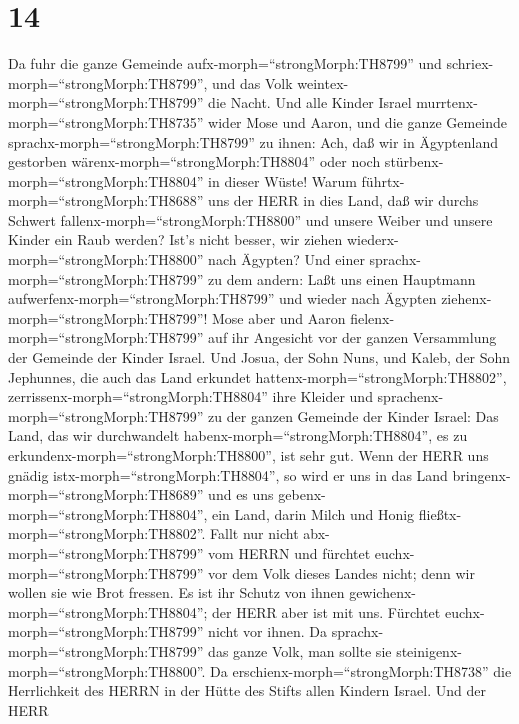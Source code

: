 \hypertarget{section-13}{%
\section{14}\label{section-13}}

 Da fuhr die ganze Gemeinde
aufx-morph=``strongMorph:TH8799'' und
schriex-morph=``strongMorph:TH8799'', und das Volk
weintex-morph=``strongMorph:TH8799'' die Nacht.  Und alle
Kinder Israel murrtenx-morph=``strongMorph:TH8735'' wider Mose und
Aaron, und die ganze Gemeinde sprachx-morph=``strongMorph:TH8799'' zu
ihnen: Ach, daß wir in Ägyptenland gestorben
wärenx-morph=``strongMorph:TH8804'' oder noch
stürbenx-morph=``strongMorph:TH8804'' in dieser Wüste! 
Warum führtx-morph=``strongMorph:TH8688'' uns der HERR in dies Land, daß
wir durchs Schwert fallenx-morph=``strongMorph:TH8800'' und unsere
Weiber und unsere Kinder ein Raub werden? Ist's nicht besser, wir ziehen
wiederx-morph=``strongMorph:TH8800'' nach Ägypten?  Und
einer sprachx-morph=``strongMorph:TH8799'' zu dem andern: Laßt uns einen
Hauptmann aufwerfenx-morph=``strongMorph:TH8799'' und wieder nach
Ägypten ziehenx-morph=``strongMorph:TH8799''!  Mose aber und
Aaron fielenx-morph=``strongMorph:TH8799'' auf ihr Angesicht vor der
ganzen Versammlung der Gemeinde der Kinder Israel.  Und
Josua, der Sohn Nuns, und Kaleb, der Sohn Jephunnes, die auch das Land
erkundet hattenx-morph=``strongMorph:TH8802'',
zerrissenx-morph=``strongMorph:TH8804'' ihre Kleider  und
sprachenx-morph=``strongMorph:TH8799'' zu der ganzen Gemeinde der Kinder
Israel: Das Land, das wir durchwandelt
habenx-morph=``strongMorph:TH8804'', es zu
erkundenx-morph=``strongMorph:TH8800'', ist sehr gut.  Wenn
der HERR uns gnädig istx-morph=``strongMorph:TH8804'', so wird er uns in
das Land bringenx-morph=``strongMorph:TH8689'' und es uns
gebenx-morph=``strongMorph:TH8804'', ein Land, darin Milch und Honig
fließtx-morph=``strongMorph:TH8802''.  Fallt nur nicht
abx-morph=``strongMorph:TH8799'' vom HERRN und fürchtet
euchx-morph=``strongMorph:TH8799'' vor dem Volk dieses Landes nicht;
denn wir wollen sie wie Brot fressen. Es ist ihr Schutz von ihnen
gewichenx-morph=``strongMorph:TH8804''; der HERR aber ist mit uns.
Fürchtet euchx-morph=``strongMorph:TH8799'' nicht vor ihnen.
 Da sprachx-morph=``strongMorph:TH8799'' das ganze Volk,
man sollte sie steinigenx-morph=``strongMorph:TH8800''. Da
erschienx-morph=``strongMorph:TH8738'' die Herrlichkeit des HERRN in der
Hütte des Stifts allen Kindern Israel.  Und der HERR
